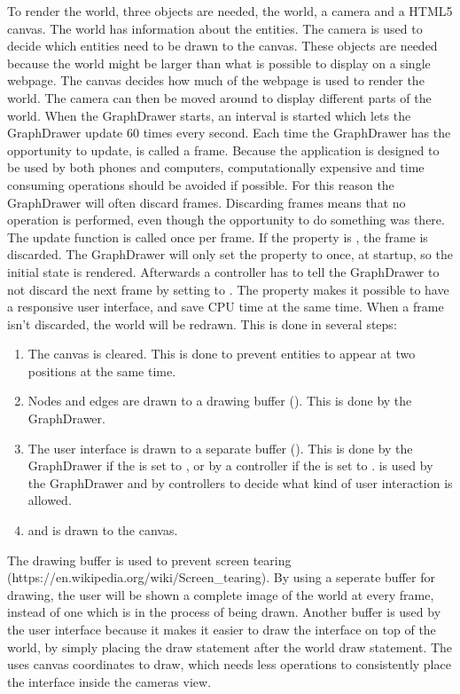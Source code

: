To render the world, three objects are needed, the world, a camera and a HTML5 canvas. The world has information about the entities. The camera is used to decide which entities need to be drawn to the canvas. These objects are needed because the world might be larger than what is possible to display on a single webpage. The canvas decides how much of the webpage is used to render the world. The camera can then be moved around to display different parts of the world. When the GraphDrawer starts, an interval is started which lets the GraphDrawer update 60 times every second. Each time the GraphDrawer has the opportunity to update, is called a frame. Because the application is designed to be used by both phones and computers, computationally expensive and time consuming operations should be avoided if possible. For this reason the GraphDrawer will often discard frames. Discarding frames means that no operation is performed, even though the opportunity to do something was there. The update function is called once per frame. If the  property is , the frame is discarded. The GraphDrawer will only set the  property to  once, at startup, so the initial state is rendered. Afterwards a controller has to tell the GraphDrawer to not discard the next frame by setting  to . The  property makes it possible to have a responsive user interface, and save CPU time at the same time. When a frame isn't discarded, the world will be redrawn. This is done in several steps:
\begin{enumerate}
    \item The canvas is cleared. This is done to prevent entities to appear at two positions at the same time.
    \item Nodes and edges are drawn to a drawing buffer (). This is done by the GraphDrawer.
    \item The user interface is drawn to a separate buffer (). This is done by the GraphDrawer if the  is set to , or by a controller if the  is set to .  is used by the GraphDrawer and by controllers to decide what kind of user interaction is allowed.
    \item {} and  is drawn to the canvas.
\end{enumerate}
The drawing buffer is used to prevent screen tearing (https://en.wikipedia.org/wiki/Screen\_tearing). By using a seperate buffer for drawing, the user will be shown a complete image of the world at every frame, instead of one which is in the process of being drawn. Another buffer is used by the user interface because it makes it easier to draw the interface on top of the world, by simply placing the draw statement after the world draw statement. The  uses canvas coordinates to draw, which needs less operations to consistently place the interface inside the cameras view.
